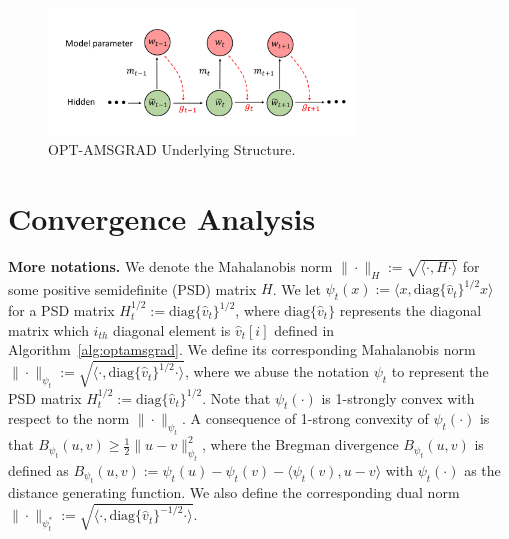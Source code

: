 \documentclass[twoside]{article}
\begin{document}
\begin{figure}[H]
\captionsetup{justification=centering}
    \vspace{-0.1in}
    \includegraphics[width=3.2in]{plots/plot.pdf}
        \vspace{-0.1in}
    \caption{\textsc{OPT-AMSGRAD} Underlying Structure.}
     \label{fig:scheme}
\end{figure}

\vspace{-0.1in}
\section{Convergence Analysis}\label{sec:analysis}
\vspace{-0.05in}

\textbf{More notations.}\hspace{0.1in}
We denote the Mahalanobis norm $\|\cdot\|_H := \sqrt{ \langle \cdot, H \cdot \rangle }$ for some positive semidefinite (PSD) matrix $H$.
We let $\psi_t(x) := \langle x, \text{diag}\{\hat{v}_t\}^{1/2} x \rangle$ for a PSD matrix $H_t^{1/2}:= \text{diag}\{\hat{v}_t\}^{1/2}$, where $\text{diag}\{\hat{v}_t\}$ represents the diagonal matrix which $i_{th}$ diagonal element is $\hat{v}_t[i]$ defined in Algorithm~\ref{alg:optamsgrad}.
We define its corresponding Mahalanobis norm $\| \cdot \|_{\psi_t}:=  \sqrt{ \langle \cdot, \text{diag}\{\hat{v}_t\}^{1/2} \cdot \rangle }$,
where we abuse the notation $\psi_t$ to represent the PSD matrix $H_t^{1/2}:=\text{diag}\{\hat{v}_t\}^{1/2}$.
Note that $\psi_t(\cdot)$ is 1-strongly convex with respect to the norm $\| \cdot \|_{\psi_t}$.
A consequence of 1-strong convexity of $\psi_t(\cdot)$ is that $B_{\psi_t}(u,v) \geq \frac{1}{2} \| u - v \|^2_{\psi_t}$, where the Bregman divergence $B_{\psi_t}(u,v)$ is defined as $B_{\psi_t}(u,v) := \psi_t(u) - \psi_t(v) - \langle \psi_t(v), u - v \rangle$ with $\psi_t(\cdot)$ as the distance generating function.
We also define the corresponding dual norm $\| \cdot \|_{\psi_t^*}:= \sqrt{ \langle \cdot, \text{diag}\{\hat{v}_t\}^{-1/2} \cdot \rangle }$.
\end{document}
